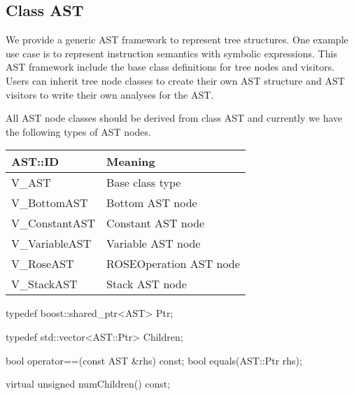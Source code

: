 \subsection{Class AST}
\label{sec:ast}

We provide a generic AST framework to represent tree structures. 
One example use case is to represent instruction semantics with symbolic expressions. 
This AST framework include the base class definitions for tree nodes and visitors. 
Users can inherit tree node classes to create their own AST structure and 
AST visitors to write their own analyses for the AST. 

All AST node classes should be derived from class AST and currently we have the
following types of AST nodes.

\begin{center}
\begin{tabular}{ll}
\toprule
AST::ID  & Meaning \\
\midrule 
    V\_AST & Base class type \\
    V\_BottomAST & Bottom AST node \\
    V\_ConstantAST & Constant AST node \\
    V\_VariableAST & Variable AST node \\
    V\_RoseAST & ROSEOperation AST node \\
    V\_StackAST & Stack AST node \\
\bottomrule
\end{tabular}
\end{center}

\begin{apient}
typedef boost::shared_ptr<AST> Ptr;
\end{apient}

\begin{apient}
typedef std::vector<AST::Ptr> Children;      
\end{apient}

\begin{apient}
bool operator==(const AST &rhs) const; 
bool equals(AST::Ptr rhs);
\end{apient}

\begin{apient}
virtual unsigned numChildren() const; 
\end{apient}

